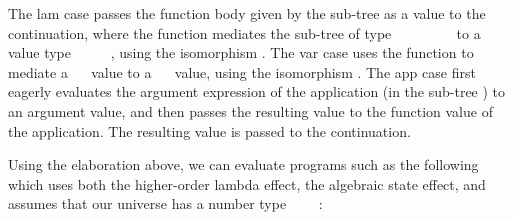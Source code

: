 %
The \ac{lam} case passes the function body given by the sub-tree  as a value to the continuation, where the  function mediates the sub-tree of type ~~~~~~~~ to a value type ~\as{(}~\as{)}~~~, using the isomorphism .
The \ac{var} case uses the  function to mediate a ~~ value to a ~~ value, using the isomorphism .
The \ac{app} case first eagerly evaluates the argument expression of the application (in the sub-tree ) to an argument value, and then passes the resulting value to the function value of the application.
The resulting value is passed to the continuation.

Using the elaboration above, we can evaluate programs such as the following which uses both the higher-order lambda effect, the algebraic state effect, and assumes that our universe has a number type ~~~~:
